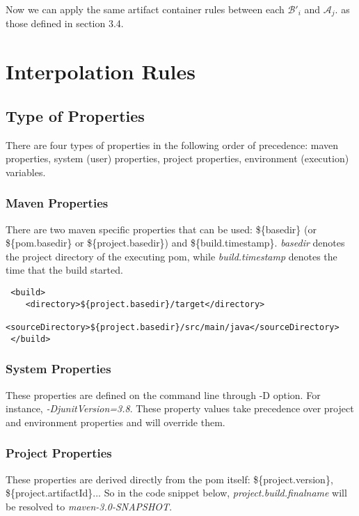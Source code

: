 \documentclass[12pt]{amsart}
\begin{document}
Now we can apply the same artifact container rules between each  \begin{math} \mathcal{B'}_{i} \end{math} and  \begin{math} \mathcal{A}_{j}\end{math}.  as those defined in section 3.4.

\section{Interpolation Rules}
\subsection{Type of Properties}
There are four types of properties in the following order of precedence: maven properties, system (user) properties, project properties, environment (execution) variables. 

\subsubsection{Maven Properties}
There are two maven specific properties that can be used: \$\{basedir\} (or \$\{pom.basedir\} or \$\{project.basedir\}) and \$\{build.timestamp\}. \emph{basedir} denotes the project directory of the executing pom, while\emph{ build.timestamp} denotes the time that the build started.

\begin{verbatim}
 <build>
    <directory>${project.basedir}/target</directory>
    <sourceDirectory>${project.basedir}/src/main/java</sourceDirectory>
 </build>
\end{verbatim}


\subsubsection{System Properties}
These properties are defined on the command line through -D option. For instance, \emph{-DjunitVersion=3.8}. These property values take precedence over project and environment properties and will override them.

\subsubsection{Project Properties}  These properties are derived directly from the pom itself: \$\{project.version\}, \$\{project.artifactId\}... So in the code snippet below, \emph{project.build.finalname} will be resolved to\emph{ maven-3.0-SNAPSHOT}. 
\end{document}
